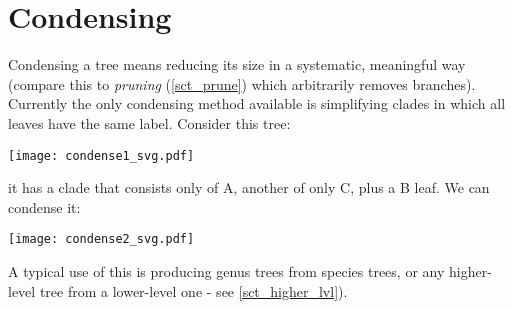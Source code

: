\section{Condensing}
\label{sct_condense}

Condensing a tree means reducing its size in a systematic, meaningful way
(compare this to \emph{pruning} (\ref{sct_prune}) which arbitrarily removes
branches). Currently the only condensing method available is simplifying
clades in which all leaves have the same label. Consider this tree:

\texttt{[image: condense1\_svg.pdf]}

it has a clade that consists only of A, another of only C, plus a B leaf. We
can condense it:


\texttt{[image: condense2\_svg.pdf]}

A typical use of this is producing genus trees from species trees, or any
higher-level tree from a lower-level one - see \ref{sct_higher_lvl}).
